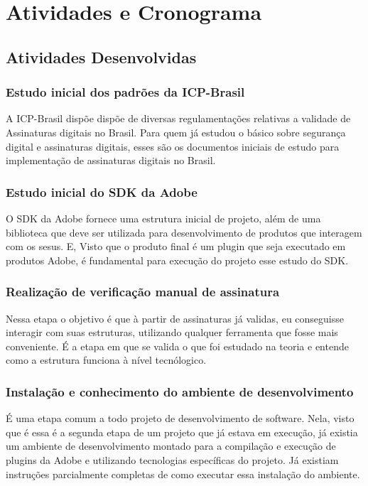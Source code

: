 \chapter[Atividades e Cronograma]{Atividades e Cronograma}

\section{Atividades Desenvolvidas}

\subsection{Estudo inicial dos padrões da ICP-Brasil}

A ICP-Brasil dispõe dispõe de diversas regulamentações relativas a validade de Assinaturas digitais no Brasil. Para quem já
estudou o básico sobre segurança digital e assinaturas digitais, esses são os documentos iniciais de estudo para implementação
de assinaturas digitais no Brasil.

\subsection{Estudo inicial do SDK da Adobe}

O SDK da Adobe fornece uma estrutura inicial de projeto, além de uma biblioteca que deve ser utilizada para desenvolvimento de produtos
que interagem com os sesus. E, Visto que o produto final é um plugin que seja executado em produtos Adobe, é fundamental para execução do projeto
esse estudo do SDK.

\subsection{Realização de verificação manual de assinatura}

Nessa etapa o objetivo é que à partir de assinaturas já validas, eu conseguisse interagir com suas estruturas, utilizando qualquer ferramenta
que fosse mais conveniente. É a etapa em que se valida o que foi estudado na teoria e entende como a estrutura funciona à nível tecnólogico.

\subsection{Instalação e conhecimento do ambiente de desenvolvimento}

É uma etapa comum a todo projeto de desenvolvimento de software. Nela, visto que é essa é a segunda etapa de um projeto que já estava em execução,
já existia um ambiente de desenvolvimento montado para a compilação e execução de plugins da Adobe e utilizando tecnologias específicas do projeto.
Já existiam instruções parcialmente completas de como executar essa instalação do ambiente.

